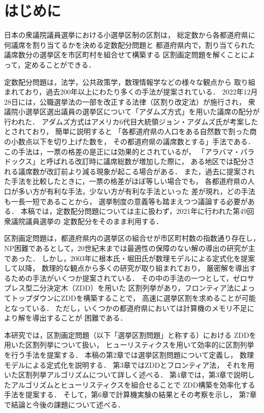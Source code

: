 \chapter{はじめに} \label{chapter:1}
日本の衆議院議員選挙における小選挙区制の区割は，
総定数から各都道府県に何議席を割り当てるかを決める定数配分問題と
都道府県内で，割り当てられた議席数分の選挙区を市区町村を組合せて構築する
区割画定問題を解くことによって，定めることができる．

定数配分問題は，法学，公共政策学，数理情報学などの様々な観点から
取り組まれており，過去200年以上にわたり多くの手法が提案されている．
2022年12月28日には，公職選挙法の一部を改正する法律（区割り改定法）が施行され，
衆議院小選挙区選出議員の選挙区について「アダムズ方式」を用いた議席の配分が行われた\cite{ichimori}．
アダムズ方式はアメリカ6代目大統領ジョン・アダムズ氏が考案したとされており，
簡単に説明すると
「各都道府県の人口をある自然数で割った商の小数点以下を切り上げた数を，
その都道府県の議席数とする」手法である．
この手法は，一票の格差の是正には効果的とされているが，
「アラバマ・パラドックス」と呼ばれる改訂時に議席総数が増加した際に，
ある地区では配分される議席数が改訂前より減る現象が起こる場合がある．
また，過去に提案された手法を比較したときに，一票の格差がほぼ等しい場合でも，
各都道府県の人口が多い方が有利な手法，少ない方が有利な手法といった
差が現れ，どの手法も一長一短であることから，
選挙制度の意義等も踏まえつつ議論する必要がある．
本稿では，定数配分問題については主に扱わず，2021年に行われた第49回衆議院議員選挙の
定数配分をそのまま利用する．

区割画定問題は，都道府県内の選挙区の組合せが市区町村数の指数通り存在し，
NP困難であるとして，20世紀末までは最適性の保障のない解の導出の研究が主であった．
しかし，2003年に根本氏・堀田氏が数理モデルによる定式化を提案\cite{nemoto}して以降，
数理的な観点から多くの研究が取り組まれており，
厳密解を導出するための手法がいくつか提案されている．
その中の手法の一つとして，ゼロサプレス型二分決定木（ZDD）を用いた
区割列挙があり，フロンティア法によってトップダウンにZDDを構築することで，
高速に選挙区割を求めることが可能となっている．
ただし，いくつかの都道府県においては計算機のメモリ不足により解を導出することが
困難である．

本研究では，区割画定問題（以下「選挙区割問題」と称する）における
ZDDを用いた区割列挙について扱い，
ヒューリスティクスを用いて効率的に区割列挙を行う手法を提案する．
本稿の第2章では選挙区割問題について定義し，
数理モデルによる定式化を説明する．
第3章ではZDDとフロンティア法，
それを用いた区割列挙アルゴリズムについて詳しく述べる．
第4章では，第3章で説明したアルゴリズムとヒューリスティクスを組合せることで
ZDD構築を効率化する手法を提案する．
そして，第6章で計算機実験の結果とその考察を示し，
第7章で結論と今後の課題について述べる．
